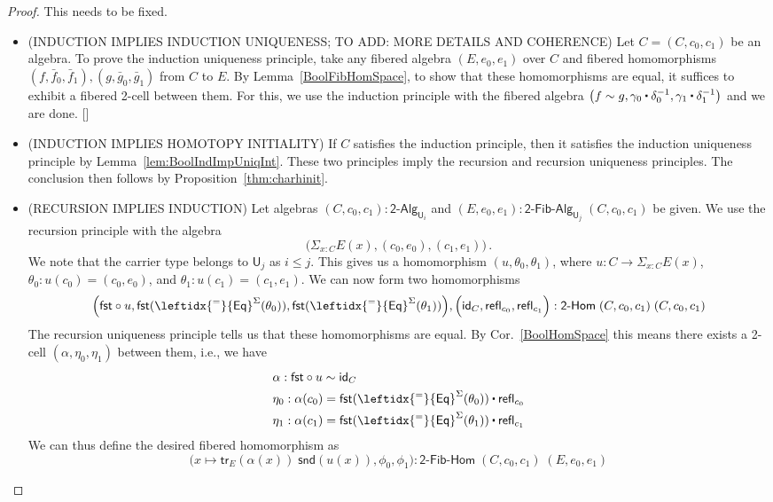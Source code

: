\documentclass[reqno,10pt,a4paper,oneside]{amsart}
\newcommand{\fst}{\mathsf{fst}}
\newcommand{\snd}{\mathsf{snd}}
\newcommand{\comp}{\circ}
\newcommand{\idfun}[1]{\mathsf{id}_{#1}}
\newcommand{\sm}[1]{\Sigma_{#1}}
\newcommand{\refl}{\mathsf{refl}}
\newcommand{\idtodpair}{\leftidx{^=}{\mathsf{Eq}}^{\Sigma}}
\newcommand{\UU}{\mathsf{U}}
\newcommand{\BoolAlg}{\mathsf{2}\text{-}\mathsf{Alg}}
\newcommand{\BoolHom}{\mathsf{2}\text{-}\mathsf{Hom}}
\newcommand{\BoolFibAlg}{\mathsf{2}\text{-}\mathsf{Fib}\text{-}\mathsf{Alg}}
\newcommand{\BoolFibHom}{\mathsf{2}\text{-}\mathsf{Fib}\text{-}\mathsf{Hom}}
\newcommand{\trans}{\mathsf{tr}}
\newcommand{\ct}{%
  \mathchoice{\mathbin{\raisebox{0.5ex}{$\displaystyle\centerdot$}}}%
             {\mathbin{\raisebox{0.5ex}{$\centerdot$}}}%
             {\mathbin{\raisebox{0.25ex}{$\scriptstyle\,\centerdot\,$}}}%
             {\mathbin{\raisebox{0.1ex}{$\scriptscriptstyle\,\centerdot\,$}}}}
\numberwithin{equation}{section}
\theoremstyle{mythm}
\theoremstyle{mydef}
\theoremstyle{myrmk}
\begin{document}
\begin{proof} This needs to be fixed. 


\begin{itemize}
\item  (INDUCTION IMPLIES INDUCTION UNIQUENESS; TO ADD: MORE DETAILS AND COHERENCE)
Let  $C = (C,c_0,c_1)$ be an algebra. To prove the induction uniqueness principle, take any fibered algebra $(E,e_0,e_1)$ over $C$ and fibered homomorphisms 
$(f,\bar{f}_0, \bar{f}_1), (g,\bar{g}_0,\bar{g}_1)$ from $C$ to $E$. By Lemma~\ref{BoolFibHomSpace}, to show that these homomorphisms are equal, it suffices to exhibit a fibered 2-cell between them. For this, we use the induction principle with the fibered algebra $\big(f \sim g, \gamma_0 \ct \delta_0^{-1}, \gamma_1 \ct \delta_1^{-1}\big)$ and we are done. []
\item  (INDUCTION IMPLIES HOMOTOPY INITIALITY)
If $C$ satisfies the induction principle, then it satisfies the induction uniqueness principle by Lemma~\ref{lem:BoolIndImpUniqInt}. These two
principles imply the recursion and recursion uniqueness principles. The conclusion then follows by Proposition~\ref{thm:charhinit}.
\item  (RECURSION IMPLIES INDUCTION)
Let algebras $(C,c_0,c_1) : \BoolAlg_{\UU_i}$ and $(E,e_0,e_1) : \BoolFibAlg_{\UU_j} \; (C,c_0,c_1)$ be given. 
We use the recursion principle with the algebra 
\[
\big(\sm{x:C} E(x), (c_0,e_0), (c_1,e_1)\big) \, .
\] We note that the carrier type belongs to $\UU_j$ as $i \leq j$. This gives us a homomorphism $(u,\theta_0,\theta_1)$, where $u : C \to \sm{x:C} E(x)$, $\theta_0 : u(c_0) = (c_0,e_0)$, and $\theta_1 : u(c_1) = (c_1,e_1)$. We can now form two homomorphisms 
\[\Big(\fst \comp u, \fst(\idtodpair(\theta_0)), \fst(\idtodpair(\theta_1))\Big), \Big(\idfun{C}, \refl_{c_0}, \refl_{c_1}\Big) : \BoolHom \; (C,c_0,c_1) \; (C,c_0,c_1)\]
The recursion uniqueness principle tells us that these homomorphisms are equal. By Cor.~\ref{BoolHomSpace} this means there exists a 2-cell $(\alpha,\eta_0,\eta_1)$ between them, i.e., we have 
\begin{align*}
& \alpha : \fst \comp u \sim \idfun{C} \\
& \eta_0 : \alpha(c_0) = \fst(\idtodpair(\theta_0)) \ct \refl_{c_0} \\
& \eta_1 : \alpha(c_1) = \fst(\idtodpair(\theta_1)) \ct \refl_{c_1}
\end{align*}
We can thus define the desired fibered homomorphism as \[\Big(x \mapsto \trans_E(\alpha(x)) \; \snd(u(x)), \phi_0, \phi_1\Big) : \BoolFibHom \; (C,c_0,c_1) \; (E,e_0,e_1)\]

\end{itemize}
\end{proof}
\end{document}
